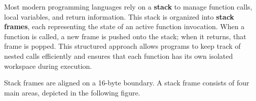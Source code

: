 %
%

Most modern programming languages rely on a \textbf{stack} to manage function calls, local variables, and return information. This stack is organized into \textbf{stack frames}, each representing the state of an active function invocation. When a function is called, a new frame is pushed onto the stack; when it returns, that frame is popped. This structured approach allows programs to keep track of nested calls efficiently and ensures that each function has its own isolated workspace during execution.


Stack frames are aligned on a 16-byte boundary. A stack frame consists of four main areas, depicted in the following figure. 

